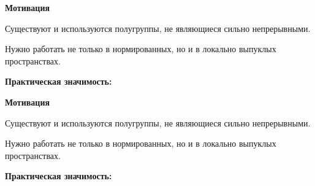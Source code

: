 \documentclass[11pt]{article}
\begin{document}
\begin{center}
{\color{notaeYELLOW}\bfseries\fontsize{44}{52}\selectfont Мотивация}
\end{center}
\vspace*{\fill}
\begin{center}
\fontsize{36}{43}\selectfont
\parbox{\linewidth}{\centering\noindent Существуют и используются полугруппы, не являющиеся сильно непрерывными.
\par}\vspace{0.4in}
\parbox{\linewidth}{\centering\noindent Нужно работать не только в нормированных, но и в локально выпуклых пространствах.
\par}\vspace{0.4in}
\parbox{\linewidth}{\centering\noindent \textbf{Практическая значимость:}
\par}\vspace{0.4in}
\parbox{\linewidth}{\centering{}
\par}\vspace{0.4in}
\parbox{\linewidth}{\centering{}
\par}\vspace{0.4in}
\end{center}
\vspace*{\fill}

\newpage

\begin{center}
{\color{notaeYELLOW}\bfseries\fontsize{44}{52}\selectfont Мотивация}
\end{center}
\vspace*{\fill}
\begin{center}
\fontsize{36}{43}\selectfont
\parbox{\linewidth}{\centering\noindent Существуют и используются полугруппы, не являющиеся сильно непрерывными.
\par}\vspace{0.4in}
\parbox{\linewidth}{\centering\noindent Нужно работать не только в нормированных, но и в локально выпуклых пространствах.
\par}\vspace{0.4in}
\parbox{\linewidth}{\centering\noindent \textbf{Практическая значимость:}
\par}\vspace{0.4in}
\parbox{\linewidth}{\centering{}
\par}\vspace{0.4in}
\parbox{\linewidth}{\centering{}
\par}\vspace{0.4in}
\parbox{\linewidth}{\centering{}
\par}\vspace{0.4in}
\end{center}
\vspace*{\fill}
\end{document}
